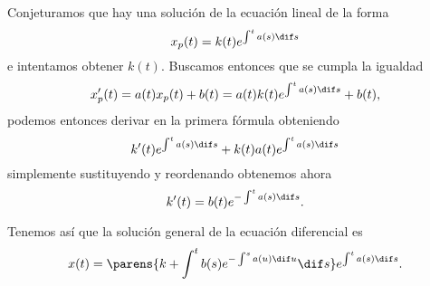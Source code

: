 \documentclass[../main.tex]{subfiles}
\begin{document}
Conjeturamos que hay una solución de la ecuación lineal de la forma
\[x_p(t) = k(t) e^{\int^t a(s) \dif s}\]
e intentamos obtener \(k(t)\). Buscamos entonces que se cumpla la igualdad
\[x'_p(t) = a(t)x_p(t) + b(t) = a(t)k(t) e^{\int^t a(s) \dif s} + b(t),\]
podemos entonces derivar en la primera fórmula obteniendo
\[k'(t) e^{\int^t a(s) \dif s} + k(t)a(t) e^{\int^t a(s) \dif s}\]
simplemente sustituyendo y reordenando obtenemos ahora 
\[k'(t) = b(t)e^{-\int^t a(s) \dif s}.\]

Tenemos así que la solución general de la ecuación diferencial es 
\[x(t) = \parens{k + \int^t b(s) e^{-\int^s a(u) \dif u} \dif s} 
	e^{\int^t a(s) \dif s}.\]
\end{document}
